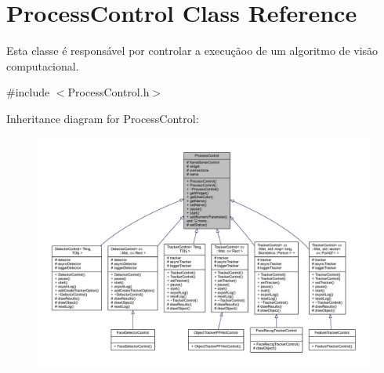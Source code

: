 \hypertarget{class_process_control}{}\section{Process\+Control Class Reference}
\label{class_process_control}


Esta classe é responsável por controlar a execuçãoo de um algoritmo de visão computacional.  




{\ttfamily \#include $<$Process\+Control.\+h$>$}



Inheritance diagram for Process\+Control\+:
\nopagebreak
\begin{figure}[H]
\begin{center}
\leavevmode
\includegraphics[width=350pt]{class_process_control__inherit__graph}
\end{center}
\end{figure}



